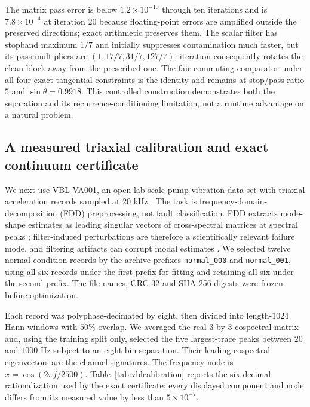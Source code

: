 \documentclass[11pt]{article}
\theoremstyle{remark}
\begin{document}
The matrix pass error is below $1.2\times10^{-10}$ through ten iterations and
is $7.8\times10^{-4}$ at iteration 20 because floating-point errors are
amplified outside the preserved directions; exact arithmetic preserves them.
The scalar filter has stopband maximum $1/7$ and initially suppresses
contamination much faster, but its pass multipliers are
$(1,17/7,31/7,127/7)$; iteration consequently rotates the clean block away
from the prescribed one.  The fair commuting comparator under all four exact
tangential constraints is the identity and remains at stop/pass ratio $5$ and
$\sin\theta=0.9918$.  This controlled construction demonstrates both the
separation and its recurrence-conditioning limitation, not a runtime advantage
on a natural problem.

\subsection{A measured triaxial calibration and exact continuum certificate}

We next use VBL-VA001, an open lab-scale pump-vibration data set with triaxial
acceleration records sampled at $20$ kHz \cite{AtmajaEtAl2024,VBLVA001}.
The task is frequency-domain-decomposition (FDD) preprocessing, not fault
classification.  FDD extracts mode-shape estimates as leading singular vectors
of cross-spectral matrices at spectral peaks \cite{BrinckerZhangAndersen2001};
filter-induced perturbations are therefore a scientifically relevant failure
mode, and filtering artifacts can corrupt modal estimates \cite{WynneEtAl2022}.
We selected twelve
normal-condition records by the archive prefixes \texttt{normal\_000} and
\texttt{normal\_001}, using all six records under the first prefix for fitting
and retaining all six under the second prefix.  The file names, CRC-32 and
SHA-256 digests were frozen before optimization.

Each record was polyphase-decimated by eight, then divided into length-$1024$
Hann windows with $50\%$ overlap.  We averaged the real $3$ by $3$ cospectral
matrix and, using the training split only, selected the five largest-trace
peaks between $20$ and $1000$ Hz subject to an eight-bin separation.  Their
leading cospectral eigenvectors are the channel signatures.  The frequency
node is $x=\cos(2\pi f/2500)$.  Table~\ref{tab:vblcalibration} reports the
six-decimal rationalization used by the exact certificate; every displayed
component and node differs from its measured value by less than
$5\times10^{-7}$.
\end{document}

